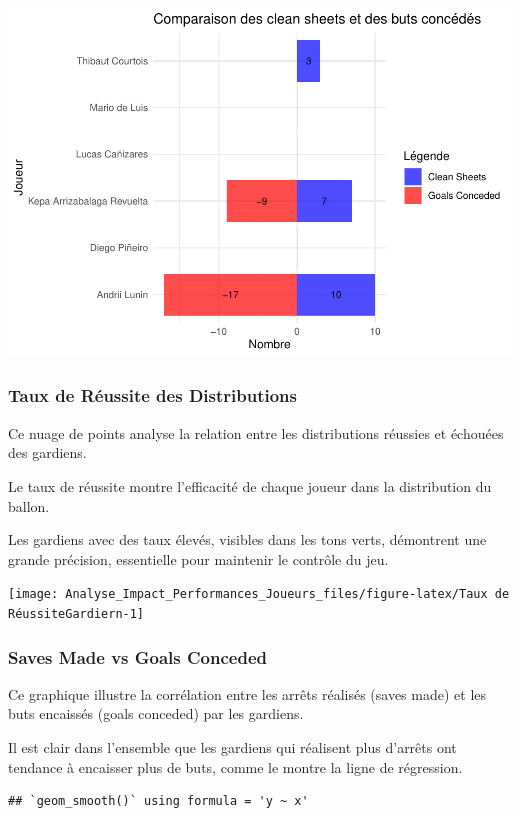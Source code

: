 \documentclass[
  6pt,
]{article}
\begin{document}
\includegraphics[width=0.8\linewidth]{Analyse_Impact_Performances_Joueurs_files/figure-latex/DistributionGardiern-1}

\subsubsection{Taux de Réussite des
Distributions}\label{taux-de-ruxe9ussite-des-distributions}

Ce nuage de points analyse la relation entre les distributions réussies
et échouées des gardiens.

Le taux de réussite montre l'efficacité de chaque joueur dans la
distribution du ballon.

Les gardiens avec des taux élevés, visibles dans les tons verts,
démontrent une grande précision, essentielle pour maintenir le contrôle
du jeu.

\texttt{[image: Analyse\_Impact\_Performances\_Joueurs\_files/figure-latex/Taux de RéussiteGardiern-1]}

\subsubsection{Saves Made vs Goals
Conceded}\label{saves-made-vs-goals-conceded}

Ce graphique illustre la corrélation entre les arrêts réalisés (saves
made) et les buts encaissés (goals conceded) par les gardiens.

Il est clair dans l'ensemble que les gardiens qui réalisent plus
d'arrêts ont tendance à encaisser plus de buts, comme le montre la ligne
de régression.

\begin{verbatim}
## `geom_smooth()` using formula = 'y ~ x'
\end{verbatim}
\end{document}
